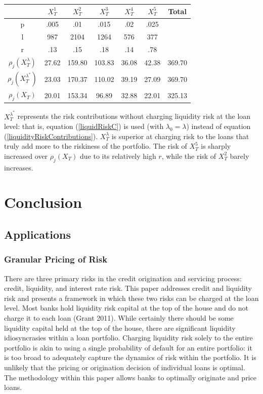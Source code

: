 \documentclass[12pt]{article}
\theoremstyle{definition}
\begin{document}
\begin{table}[H]
\centering
\begin{tabular}{ccccccc}
&\(X_T^1\) & \(X_T^2\)& \(X_T^3\)& \(X_T^4\)& \(X_T^5\)  & Total\\
\hline
p& .005 & .01& .015& .02& .025 & \\
l & 987 &2104 & 1264 & 576 &377 &\\
r & .13 & .15 & .18 & .14 & .78  &\\
\(\rho_j\left(X_T^\lambda\right)\) & 27.62&159.80&103.83&36.08&42.38&369.70 \\
\(\rho_j\left(X_T ^ {\lambda^*}\right)\) & 23.03&170.37&110.02&39.19&27.09&369.70 \\
\(\rho_j(X_T)\) & 20.01&153.34&96.89&32.88&22.01&325.13 \\

\end{tabular}
\end{table}
\(X_T ^ {\lambda^*} \) represents the risk contributions without charging liquidity risk at the loan level: that is, equation (\ref{liquidRiskC}) is used (with \(\lambda_0=\lambda\)) instead of equation (\ref{liquidityRiskContributions}).  \(X_T ^ \lambda\) is superior at charging risk to the loans that truly add more to the riskiness of the portfolio.  The risk of \(X_T ^ 5\) is sharply increased over \(\rho_j (X_T)\) due to its relatively high \(r\), while the risk of \(X_T ^ 2\) barely increases.

\section{Conclusion}

\subsection{Applications}
\subsubsection{Granular Pricing of Risk}
There are three primary risks in the credit origination and servicing process: credit, liquidity, and interest rate risk.  This paper addresses credit and liquidity risk and presents a framework in which these two risks can be charged at the loan level.  Most banks hold liquidity risk capital at the top of the house and do not charge it to each loan (Grant 2011). While certainly there should be some liquidity capital held at the top of the house, there are significant liquidity idiosyncrasies within a loan portfolio.  Charging liquidity risk solely to the entire portfolio is akin to using a single probability of default for an entire portfolio: it is too broad to adequately capture the dynamics of risk within the portfolio.  It is unlikely that the pricing or origination decision of individual loans is optimal.  The methodology within this paper allows banks to optimally originate and price loans.
\end{document}
